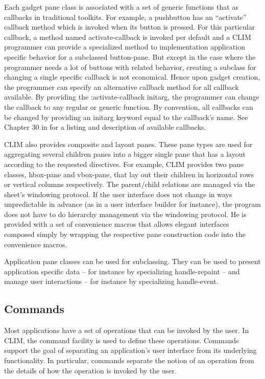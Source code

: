\documentclass[twocolumn,a4paper]{article}
\newcommand {\code}[1]{{\sffamily #1}}
\newcommand {\CLIM}{{\small CLIM}}
\let\class\code
\let\method\code
\let\keyword\code
\begin{document}
Each gadget pane class is associated with a set of generic functions
that as callbacks in traditional toolkits. For example, a pushbutton
has an ``activate'' callback method which is invoked when its button
is pressed. For this particular callback, a method named
\method{activate-callback} is invoked per default and a \CLIM{}
programmer can provide a specialized method to implementation
application specific behavior for a subclassed button-pane. But except
in the case where the programmer needs a lot of buttons with related
behavior, creating a subclass for changing a single specific callback
is not economical. Hence upon gadget creation, the programmer can
specify an alternative callback method for all callback available. By
providing the \keyword{:activate-callback} initarg, the programmer can
change the callback to any regular or generic function. By convention,
all callbacks can be changed by providing an initarg keyword equal to
the callback's name. See Chapter 30 in \cite{clim-spec} for a listing
and description of available callbacks.

\CLIM{} also provides composite and layout panes. These pane types are
used for aggregating several children panes into a bigger single pane
that has a layout according to the requested directives.  For example,
\CLIM{} provides two pane classes, \class{hbox-pane} and
\class{vbox-pane}, that lay out their children in horizontal rows or
vertical columns respectively. The parent/child relations are managed
via the sheet's windowing protocol. If the user interface does not
change in ways unpredictable in advance (as in a user interface
builder for instance), the program does not have to do hierarchy
management via the windowing protocol. He is provided with a set of
convenience macros that allows elegant interfaces composed simply by
wrapping the respective pane construction code into the convenience
macros.

Application pane classes can be used for subclassing. They can be used
to present application specific data -- for instance by specializing
\method{handle-repaint} -- and manage user interactions -- for
instance by specializing \method{handle-event}.

\subsection{Commands}

Most applications have a set of operations that can be invoked by the
user. In \CLIM{}, the command facility is used to define these
operations. Commands support the goal of separating an application's
user interface from its underlying functionality.  In particular,
commands separate the notion of an operation from the details of how
the operation is invoked by the user.
\end{document}
